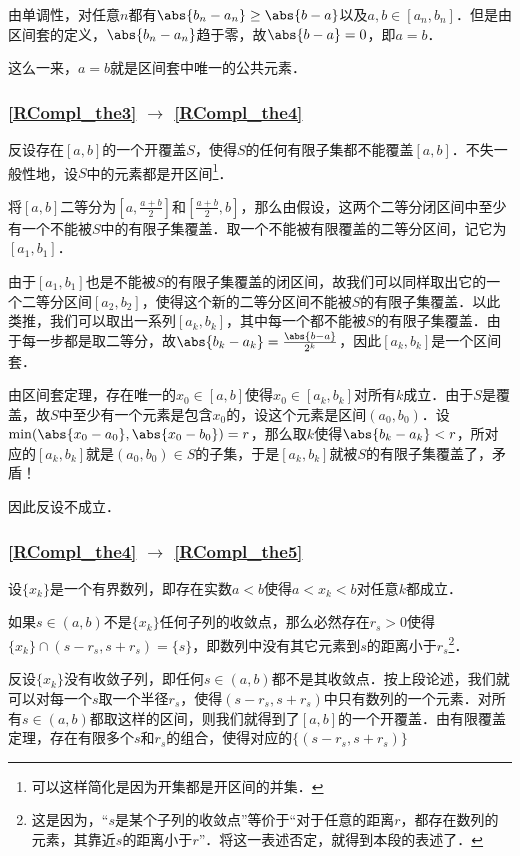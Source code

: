 由单调性，对任意$n$都有$\abs{b_n-a_n}\geq\abs{b-a}$以及$a, b\in [a_n, b_n]$．但是由区间套的定义，$\abs{b_n-a_n}$趋于零，故$\abs{b-a}=0$，即$a=b$．

这么一来，$a=b$就是区间套中唯一的公共元素．

\subsubsection{\autoref{RCompl_the3} $\to$ \autoref{RCompl_the4} }

反设存在$[a, b]$的一个开覆盖$S$，使得$S$的任何有限子集都不能覆盖$[a, b]$．不失一般性地，设$S$中的元素都是开区间\footnote{可以这样简化是因为开集都是开区间的并集．}．

将$[a, b]$二等分为$[a, \frac{a+b}{2}]$和$[\frac{a+b}{2}, b]$，那么由假设，这两个二等分闭区间中至少有一个不能被$S$中的有限子集覆盖．取一个不能被有限覆盖的二等分区间，记它为$[a_1, b_1]$．

由于$[a_1, b_1]$也是不能被$S$的有限子集覆盖的闭区间，故我们可以同样取出它的一个二等分区间$[a_2, b_2]$，使得这个新的二等分区间不能被$S$的有限子集覆盖．以此类推，我们可以取出一系列$[a_k, b_k]$，其中每一个都不能被$S$的有限子集覆盖．由于每一步都是取二等分，故$\abs{b_k-a_k}=\frac{\abs{b-a}}{2^k}$，因此$[a_k, b_k]$是一个区间套．

由区间套定理，存在唯一的$x_0\in[a, b]$使得$x_0\in[a_k, b_k]$对所有$k$成立．由于$S$是覆盖，故$S$中至少有一个元素是包含$x_0$的，设这个元素是区间$(a_0, b_0)$．设$\min(\abs{x_0-a_0}, \abs{x_0-b_0})=r$，那么取$k$使得$\abs{b_k-a_k}<r$，所对应的$[a_k, b_k]$就是$(a_0, b_0)\in S$的子集，于是$[a_k, b_k]$就被$S$的有限子集覆盖了，矛盾！

因此反设不成立．

\subsubsection{\autoref{RCompl_the4} $\to$ \autoref{RCompl_the5} }

设$\{x_k\}$是一个有界数列，即存在实数$a<b$使得$a<x_k<b$对任意$k$都成立．

如果$s\in(a, b)$不是$\{x_k\}$任何子列的收敛点，那么必然存在$r_s>0$使得$\{x_k\}\cap (s-r_s, s+r_s)=\{s\}$，即数列中没有其它元素到$s$的距离小于$r_s$\footnote{这是因为，“$s$是某个子列的收敛点”等价于“对于任意的距离$r$，都存在数列的元素，其靠近$s$的距离小于$r$”．将这一表述否定，就得到本段的表述了．}．

反设$\{x_k\}$没有收敛子列，即任何$s\in(a, b)$都不是其收敛点．按上段论述，我们就可以对每一个$s$取一个半径$r_s$，使得$(s-r_s, s+r_s)$中只有数列的一个元素．对所有$s\in(a, b)$都取这样的区间，则我们就得到了$[a, b]$的一个开覆盖．由有限覆盖定理，存在有限多个$s$和$r_s$的组合，使得对应的$\{(s-r_s, s+r_s)\}$















